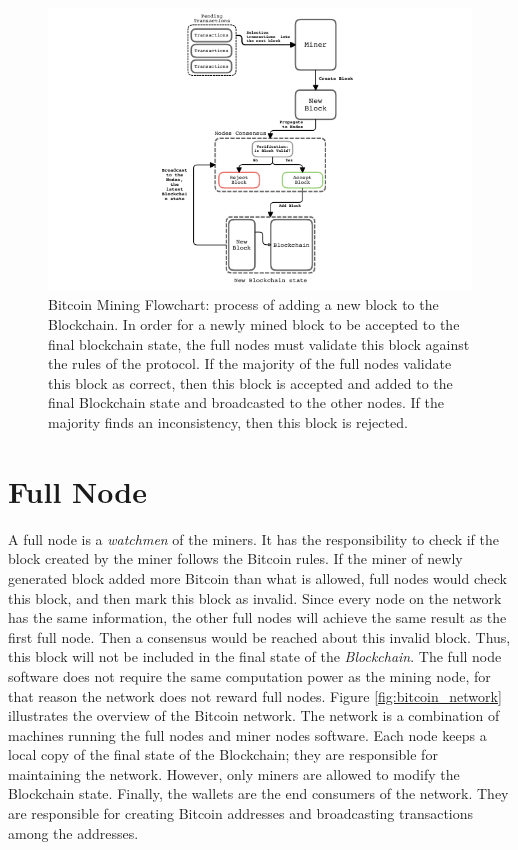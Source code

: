 \documentclass[../../thesis.tex]{subfiles}
\begin{document}
\begin{figure}[H]
\centering
\includegraphics[width=\textwidth]{content/bitcoin/img/blocks_flowchart}
\caption{Bitcoin Mining Flowchart: process of adding a new block to the Blockchain.  In order for a newly mined block to be accepted to the final blockchain state, the full nodes must validate this block against the rules of the protocol. If the majority of the full nodes validate this block as correct, then this block is accepted and added to the final Blockchain state and broadcasted to the other nodes. If the majority finds an inconsistency, then this block is rejected. }
\label{fig:blocks_flowchart}
\end{figure}

\section{Full Node}
\label{sec:bitcoin_full_node}

A full node is a \textit{watchmen} of the miners. It has the responsibility to check if the block created by the miner follows the Bitcoin rules. If the miner of newly generated block added more Bitcoin than what is allowed, full nodes would check this block, and then mark this block as invalid. Since every node on the network has the same information, the other full nodes will achieve the same result as the first full node. Then a consensus would be reached about this invalid block. Thus, this block will not be included in the final state of the \textit{Blockchain}. The full node software does not require the same computation power as the mining node, for that reason the network does not reward full nodes. Figure \ref{fig:bitcoin_network} illustrates the overview of the Bitcoin network. The network is a combination of machines running the full nodes and miner nodes software. Each node keeps a local copy of the final state of the Blockchain; they are responsible for maintaining the network. However, only miners are allowed to modify the Blockchain state. Finally, the wallets are the end consumers of the network. They are responsible for creating Bitcoin addresses and broadcasting transactions among the addresses.
\end{document}
